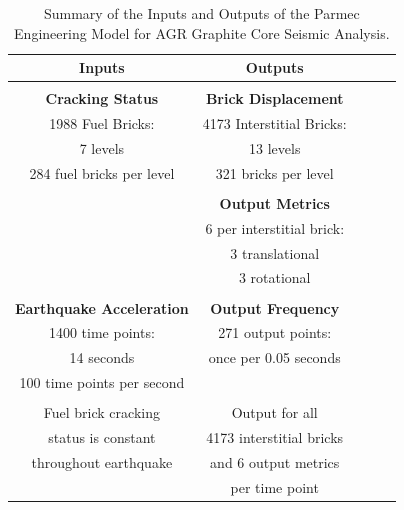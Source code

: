 \begin{table}[h!]
	\begin{center}
		
		\begin{tabular}{c|c|c|r|c} %
			\textbf{Inputs} & \textbf{Outputs}  \\
			
			\hline
			& \\
			\textbf{Cracking Status}   &  \textbf{ Brick Displacement} \\
			1988 Fuel Bricks:         & 4173 Interstitial Bricks: \\ 
			7 levels    & 13 levels       \\
			284 fuel bricks per level &  321 bricks per level  \\
			&    \\
			& \textbf{Output Metrics}  \\
			& 6 per interstitial brick: \\ 
			
			&  3 translational \\
			&  3 rotational \\
			
			& \\
			
			\textbf{Earthquake Acceleration} & \textbf{Output Frequency} \\
			1400 time points: &              271 output points:     \\
			14 seconds &  once per 0.05 seconds    \\
			100 time points per second &     \\
			
			& \\
			
			Fuel brick cracking & Output for all \\
			status is constant & 4173 interstitial bricks \\
			throughout earthquake & and 6 output metrics \\
			& per time point \\
			
			
		\end{tabular}
		\caption{Summary of the Inputs and Outputs of the Parmec Engineering Model for AGR Graphite Core Seismic Analysis.}
		\label{tab:parmecIO}
	\end{center}
\end{table}


